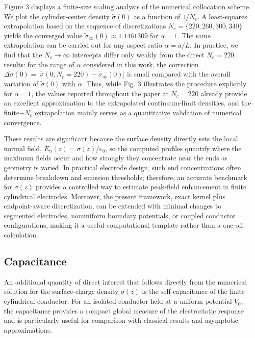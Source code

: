 \documentclass[12pt]{article}
\begin{document}
Figure 3 displays a finite-size scaling analysis of the numerical collocation
scheme. We plot the cylinder-center density $\widetilde{\sigma}(0)$ as a
function of $1/N_{c}$. A least-squares extrapolation based on the sequence of
discretizations $N_{c}=\{220,260,300,340\}$ yields the converged value
$\widetilde{\sigma}_{\infty}(0)\approx1.1461309$ for $\alpha=1$. The same
extrapolation can be carried out for any aspect ratio $\alpha=a/L$. In
practice, we find that the $N_{c}\rightarrow\infty$ intercepts differ only
weakly from the direct $N_{c}=220$ results: for the range of $\alpha$
considered in this work, the correction $\Delta\widetilde{\sigma}(0)=\left|
\widetilde{\sigma}(0,N_{c}=220)-\widetilde{\sigma}_{\infty}(0)\right|  $ is
small compared with the overall variation of $\widetilde{\sigma}(0)$ with
$\alpha$. Thus, while Fig. 3 illustrates the procedure explicitly for
$\alpha=1$, the values reported throughout the paper at $N_{c}=220$ already
provide an excellent approximation to the extrapolated continuum-limit
densities, and the finite$-N_{c}$ extrapolation mainly serves as a
quantitative validation of numerical convergence.

These results are significant because the surface density directly sets the
local normal field, $E_{n}(z)=\sigma(z)/\varepsilon_{0}$, so the computed
profiles quantify where the maximum fields occur and how strongly they
concentrate near the ends as geometry is varied. In practical electrode
design, such end concentrations often determine breakdown and emission
thresholds; therefore, an accurate benchmark for $\sigma(z)$ provides a
controlled way to estimate peak-field enhancement in finite cylindrical
electrodes. Moreover, the present framework, exact kernel plus endpoint-aware
discretization, can be extended with minimal changes to segmented electrodes,
nonuniform boundary potentials, or coupled conductor configurations, making it
a useful computational template rather than a one-off calculation.

\subsection{Capacitance}

An additional quantity of direct interest that follows directly from the
numerical solution for the surface-charge density $\sigma(z)$ is the
self-capacitance of the finite cylindrical conductor. For an isolated
conductor held at a uniform potential $V_{0}$, the capacitance provides a
compact global measure of the electrostatic response and is particularly
useful for comparison with classical results and asymptotic approximations.
\end{document}
